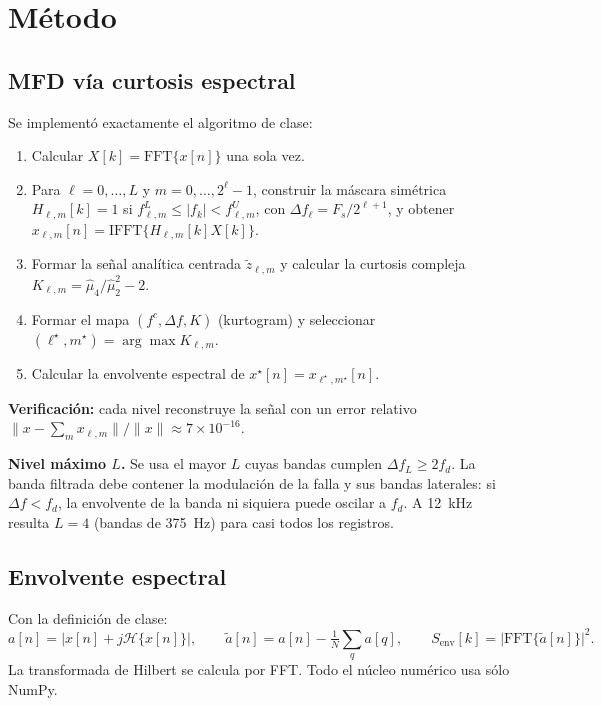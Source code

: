 \documentclass[11pt,a4paper]{article}
\begin{document}
\section{Método}
\subsection{MFD vía curtosis espectral}
Se implementó exactamente el algoritmo de clase:
\begin{enumerate}[itemsep=1pt]
\item Calcular $X[k]=\mathrm{FFT}\{x[n]\}$ una sola vez.
\item Para $\ell=0,\dots,L$ y $m=0,\dots,2^\ell-1$, construir la máscara simétrica $H_{\ell,m}[k]=1$ si $f^L_{\ell,m}\le|f_k|<f^U_{\ell,m}$, con $\Delta f_\ell=F_s/2^{\ell+1}$, y obtener $x_{\ell,m}[n]=\mathrm{IFFT}\{H_{\ell,m}[k]X[k]\}$.
\item Formar la señal analítica centrada $\tilde z_{\ell,m}$ y calcular la curtosis compleja $K_{\ell,m}=\hat\mu_4/\hat\mu_2^2-2$.
\item Formar el mapa $(f^c,\Delta f,K)$ (kurtogram) y seleccionar $(\ell^\star,m^\star)=\arg\max K_{\ell,m}$.
\item Calcular la envolvente espectral de $x^\star[n]=x_{\ell^\star,m^\star}[n]$.
\end{enumerate}
\textbf{Verificación:} cada nivel reconstruye la señal con un error relativo $\|x-\sum_m x_{\ell,m}\|/\|x\|\approx7\times10^{-16}$.

\textbf{Nivel máximo $L$.} Se usa el mayor $L$ cuyas bandas cumplen $\Delta f_L\ge 2f_d$. La banda filtrada debe contener la modulación de la falla y sus bandas laterales: si $\Delta f<f_d$, la envolvente de la banda ni siquiera puede oscilar a $f_d$. A 12~kHz resulta $L=4$ (bandas de 375~Hz) para casi todos los registros.

\subsection{Envolvente espectral}
Con la definición de clase:
\[
a[n]=\big|x[n]+j\mathcal H\{x[n]\}\big|,\qquad \tilde a[n]=a[n]-\tfrac1N\textstyle\sum_q a[q],\qquad S_{\mathrm{env}}[k]=\big|\mathrm{FFT}\{\tilde a[n]\}\big|^2 .
\]
La transformada de Hilbert se calcula por FFT. Todo el núcleo numérico usa sólo NumPy.
\end{document}
